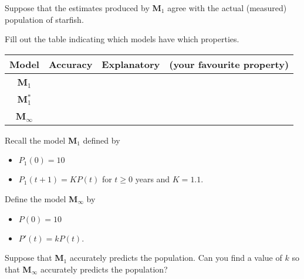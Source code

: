 \documentclass{workbook}
\begin{document}
\begin{slide}
	\question
	Suppose that the estimates produced by \textbf{M$_1$} agree with the actual (measured) population of starfish.

	Fill out the table indicating which models have which
	properties.

	\begin{center}
	\begin{tabular}{|c|c|c|c|}
		\hline
		Model & Accuracy & Explanatory & (your favourite property)\\
		\hline
		\textbf{M$_1$} & \phantom{$\displaystyle\int$} & & \\
		\hline
		\textbf{M$_1^*$} &\phantom{$\displaystyle\int$} & & \\
		\hline
		\textbf{M$_\infty$} &\phantom{$\displaystyle\int$} & & \\
		\hline
	\end{tabular}
	\end{center}
\end{slide}

\begin{slide}
	\question
	Recall the model \textbf{M$_1$} defined by
	\begin{itemize}
		\item $P_1(0)=10$
		\item $P_1(t+1) = KP(t)$ for $t\geq 0$ years and $K=1.1$.
	\end{itemize}
	Define the model \textbf{M$_\infty$} by
	\begin{itemize}
		\item $P(0)=10$
		\item $P'(t) = kP(t)$.
	\end{itemize}

	\begin{parts}
		\item Suppose that \textbf{M$_1$} accurately predicts the population. Can you find a value of $k$ so that \textbf{M$_\infty$}
		accurately predicts the population?
	\end{parts}

	\vspace*{1in}
\end{slide}
\end{document}
